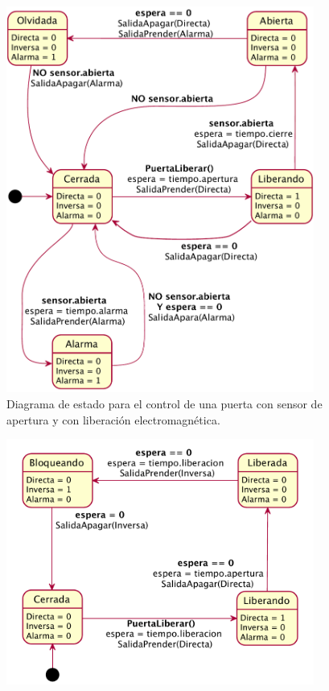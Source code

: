 \begin{itemize}
\begin{figure}[H]
	\centering
	\includegraphics[width=0.9\textwidth]{Figures/PNK-DE002.pdf}
	\caption[Diagrama de estados con cerradura electromagnética y sensor]{Diagrama de estado para el control de una puerta con sensor de apertura y con liberación electromagnética.}
	\label{fig:ControlSinCon}
\end{figure}

\begin{figure}[H]
	\centering
	\includegraphics[width=0.9\textwidth]{Figures/PNK-DE003.pdf}
	

\end{figure}
\end{itemize}
